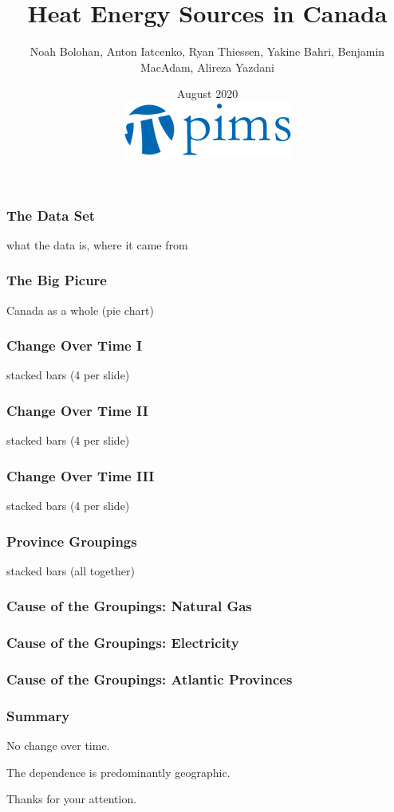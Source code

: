 \documentclass{beamer}
\title{Heat Energy Sources in Canada}
\author{Noah Bolohan, Anton Iatcenko, Ryan Thiessen, Yakine Bahri, Benjamin MacAdam, Alireza Yazdani}
\institute{Math\textsuperscript{Industry}}
\date{August 2020  \\ \vspace{30pt} \includegraphics[scale=0.3]{pims_logo.png} }
\begin{document}
\frame{\titlepage}

\begin{frame}
\frametitle{The Data Set}
what the data is, where it came from
\end{frame}


\begin{frame}
\frametitle{The Big Picure}
Canada as a whole (pie chart)
\end{frame}


\begin{frame}
\frametitle{Change Over Time I}
stacked bars (4 per slide)
\end{frame}


\begin{frame}
\frametitle{Change Over Time II}
stacked bars (4 per slide)
\end{frame}


\begin{frame}
\frametitle{Change Over Time III}
stacked bars (4 per slide)
\end{frame}


\begin{frame}
\frametitle{Province Groupings}
stacked bars (all together)
\end{frame}


\begin{frame}
\frametitle{Cause of the Groupings: Natural Gas}

\end{frame}


\begin{frame}
\frametitle{Cause of the Groupings: Electricity}

\end{frame}


\begin{frame}
\frametitle{Cause of the Groupings: Atlantic Provinces}

\end{frame}



\begin{frame}
\frametitle{Summary}

No change over time. 

The dependence is predominantly geographic. 

Thanks for your attention.  

\end{frame}
\end{document}
